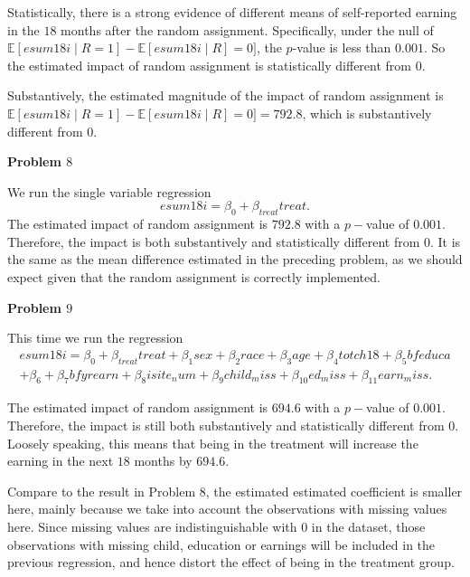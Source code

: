 \documentclass[11pt,a4paper]{amsart}
\theoremstyle{plain}
\theoremstyle{definition}
\begin{document}
Statistically, there is a strong evidence of different means of self-reported earning in the $18$ months after the random assignment. Specifically, under the null of $\mathbb{E}[esum18i \mid R = 1] - \mathbb{E}[esum18i \mid R]  = 0]$, the $p$-value is less than $0.001$. So the estimated impact of random assignment is statistically different from $0$.

Substantively, the estimated magnitude of the impact of random assignment is $\mathbb{E}[esum18i \mid R = 1] - \mathbb{E}[esum18i \mid R]  = 0] = 792.8$, which is substantively different from $0$. 

\vspace{10pt}
 
\textbf{Problem $8$}\hfil

We run the single variable regression
\[	esum18i = \beta_{0}  + \beta_{treat} treat.	\] 
The estimated impact of random assignment is $792.8$ with a $p-$value of $0.001$. Therefore, the impact is both substantively and statistically different from $0$. It is the same as the mean difference estimated in the preceding problem, as we should expect given that the random assignment is correctly implemented.

\vspace{10pt}

\textbf{Problem $9$}\hfil

This time we run the regression
\[ \begin{aligned}
		esum18i = \beta_{0}  + \beta_{treat} treat + \beta_{1}sex + \beta_{2}race + \beta_{3}age + \beta_{4} totch18 + \beta_{5}bfeduca \\
		+ \beta_{6} + \beta_{7} bfyrearn + \beta_{8}i site_num + \beta_{9}child_miss + \beta_{10}ed_miss + \beta_{11} earn_miss.
\end{aligned}	\] 

The estimated impact of random assignment is $694.6$ with a $p-$value of $0.001$. Therefore, the impact is still both substantively and statistically different from $0$. Loosely speaking, this means that being in the treatment will increase the earning in the next $18$ months by $694.6$. 

Compare to the result in Problem $8$, the estimated estimated coefficient is smaller here, mainly because we take into account the observations with missing values here. Since missing values are indistinguishable with $0$ in the dataset,  those observations with missing child, education or earnings  will be included in the previous regression, and hence distort the effect of being in the treatment group.
\end{document}
